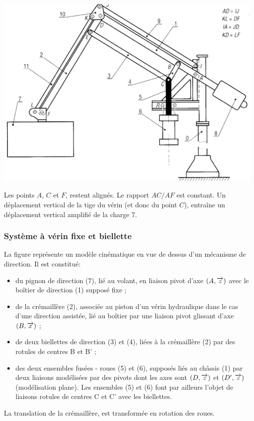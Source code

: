 \documentclass[11pt,oneside]{article}
\begin{document}
\begin{center}
\includegraphics[width=.8\textwidth]{png/fig_125}
\end{center}

Les points $A$, $C$ et $F$, restent alignés. Le rapport $AC/AF$ est constant.
Un déplacement vertical de la tige du vérin (et donc du point $C$), entraîne un déplacement vertical amplifié de la charge 7. 


\subsubsection{Système à vérin fixe et biellette}

La figure représente un modèle cinématique en vue de dessus d’un mécanisme de direction.
Il est constitué:
\begin{itemize}
\item du pignon de direction (7), lié au volant, en liaison pivot d'axe $(A,\overrightarrow{z})$ avec le boîtier de direction (1) supposé fixe ;
\item de la crémaillère (2), associée au piston d'un vérin hydraulique dans le cas d'une direction assistée, lié au boîtier par une liaison pivot glissant d'axe $(B,\overrightarrow{x})$ ;
\item de deux biellettes de direction (3) et (4), liées à la crémaillère (2) par des rotules de centres B et B' ;
\item des deux ensembles fusées - roues (5) et (6), supposés liés au châssis (1) par deux liaisons modélisées par des pivots dont les axes sont  $(D,\overrightarrow{z})$ et  $(D',\overrightarrow{z})$ (modélisation plane). Les ensembles (5) et (6) font par ailleurs l'objet de liaisons rotules de centres C et C' avec les biellettes.
\end{itemize}

La translation de la crémaillère, est transformée en rotation des roues.
\end{document}
